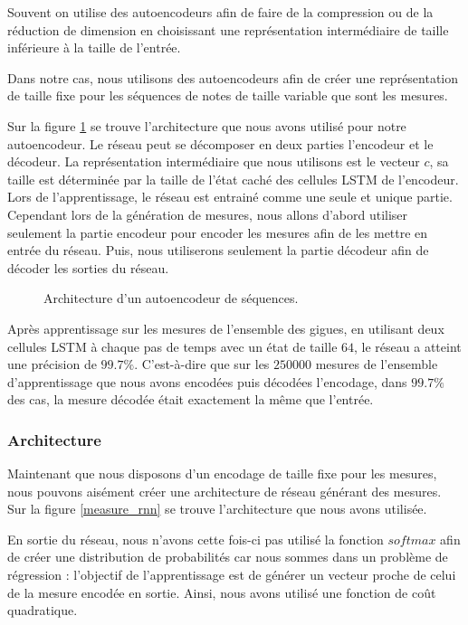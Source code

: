 Souvent on utilise des autoencodeurs afin de faire de la compression ou de la réduction de dimension en choisissant une représentation intermédiaire de taille inférieure à la taille de l'entrée.

Dans notre cas, nous utilisons des autoencodeurs afin de créer une représentation de taille fixe pour les séquences de notes de taille variable que sont les mesures.

Sur la figure \ref{autoencoder} se trouve l'architecture que nous avons utilisé pour notre autoencodeur. Le réseau peut se décomposer en deux parties l'encodeur et le décodeur. La représentation intermédiaire que nous utilisons est le vecteur $c$, sa taille est déterminée par la taille de l'état caché des cellules LSTM de l'encodeur. Lors de l'apprentissage, le réseau est entrainé comme une seule et unique partie. Cependant lors de la génération de mesures, nous allons d'abord utiliser seulement la partie encodeur pour encoder les mesures afin de les mettre en entrée du réseau. Puis, nous utiliserons seulement la partie décodeur afin de décoder les sorties du réseau. 

\begin{figure}[h!]
\begin{center}

\caption{Architecture d'un autoencodeur de séquences.}
\label{autoencoder}
\end{center}
\end{figure}

Après apprentissage sur les mesures de l'ensemble des gigues, en utilisant deux cellules LSTM à chaque pas de temps avec un état de taille $64$, le réseau a atteint une précision de $99.7\%$. C'est-à-dire que sur les $250000$ mesures de l'ensemble d'apprentissage que nous avons encodées puis décodées l'encodage, dans $99.7\%$ des cas, la mesure décodée était exactement la même que l'entrée.

\subsubsection{Architecture}

Maintenant que nous disposons d'un encodage de taille fixe pour les mesures, nous pouvons aisément créer une architecture de réseau générant des mesures. Sur la figure \ref{measure_rnn} se trouve l'architecture que nous avons utilisée.

En sortie du réseau, nous n'avons cette fois-ci pas utilisé la fonction $softmax$ afin de créer une distribution de probabilités car nous sommes dans un problème de régression : l'objectif de l'apprentissage est de générer un vecteur proche de celui de la mesure encodée en sortie. Ainsi, nous avons utilisé une fonction de coût quadratique.

